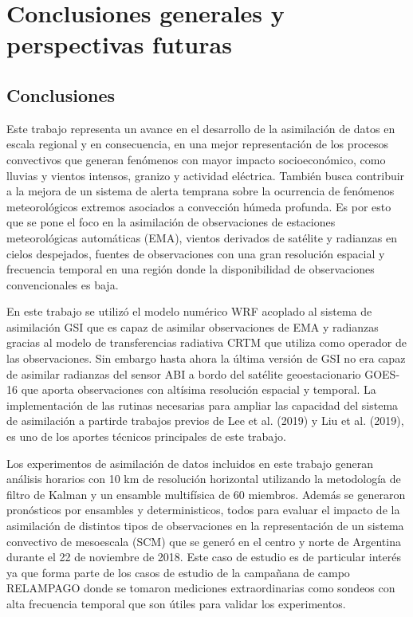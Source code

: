 \documentclass[12pt,oneside,a4paper]{reedthesis}
\begin{document}
\hypertarget{conclusiones-generales-y-perspectivas-futuras}{%
\chapter{Conclusiones generales y perspectivas futuras}\label{conclusiones-generales-y-perspectivas-futuras}}

\hypertarget{conclusiones-3}{%
\section{Conclusiones}\label{conclusiones-3}}

Este trabajo representa un avance en el desarrollo de la asimilación de datos en escala regional y en consecuencia, en una mejor representación de los procesos convectivos que generan fenómenos con mayor impacto socioeconómico, como lluvias y vientos intensos, granizo y actividad eléctrica. También busca contribuir a la mejora de un sistema de alerta temprana sobre la ocurrencia de fenómenos meteorológicos extremos asociados a convección húmeda profunda. Es por esto que se pone el foco en la asimilación de observaciones de estaciones meteorológicas automáticas (EMA), vientos derivados de satélite y radianzas en cielos despejados, fuentes de observaciones con una gran resolución espacial y frecuencia temporal en una región donde la disponibilidad de observaciones convencionales es baja.

En este trabajo se utilizó el modelo numérico WRF acoplado al sistema de asimilación GSI que es capaz de asimilar observaciones de EMA y radianzas gracias al modelo de transferencias radiativa CRTM que utiliza como operador de las observaciones. Sin embargo hasta ahora la última versión de GSI no era capaz de asimilar radianzas del sensor ABI a bordo del satélite geoestacionario GOES-16 que aporta observaciones con altísima resolución espacial y temporal. La implementación de las rutinas necesarias para ampliar las capacidad del sistema de asimilación a partirde trabajos previos de Lee et al. (2019) y Liu et al. (2019), es uno de los aportes técnicos principales de este trabajo.

Los experimentos de asimilación de datos incluidos en este trabajo generan análisis horarios con 10 km de resolución horizontal utilizando la metodología de filtro de Kalman y un ensamble multifísica de 60 miembros. Además se generaron pronósticos por ensambles y deterministicos, todos para evaluar el impacto de la asimilación de distintos tipos de observaciones en la representación de un sistema convectivo de mesoescala (SCM) que se generó en el centro y norte de Argentina durante el 22 de noviembre de 2018. Este caso de estudio es de particular interés ya que forma parte de los casos de estudio de la campañana de campo RELAMPAGO donde se tomaron mediciones extraordinarias como sondeos con alta frecuencia temporal que son útiles para validar los experimentos.
\end{document}
